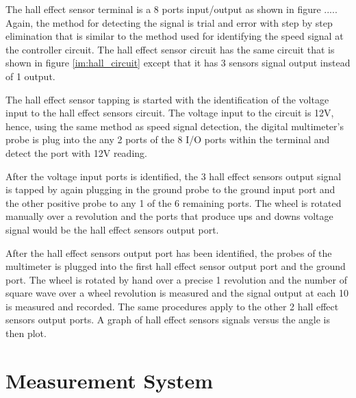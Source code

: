 The hall effect sensor terminal is a 8 ports input/output as shown in figure ..... Again, the method for detecting the signal is trial and error with step by step elimination that is similar to the method used for identifying the speed signal at the controller circuit. The hall effect sensor circuit has the same circuit that is shown in figure \ref{im:hall_circuit} except that it has 3 sensors signal output instead of 1 output. 

The hall effect sensor tapping is started with the identification of the voltage input to the hall effect sensors circuit. The voltage input to the circuit is 12V, hence, using the same method as speed signal detection, the digital multimeter's probe is plug into the any 2 ports of the 8 I/O ports within the terminal and detect the port with 12V reading.

After the voltage input ports is identified, the 3 hall effect sensors output signal is tapped by again plugging in the ground probe to the ground input port and the other positive probe to any 1 of the 6 remaining ports. The wheel is rotated manually over a revolution and the ports that produce ups and downs voltage signal would be the hall effect sensors output port.

After the hall effect sensors output port has been identified, the probes of the multimeter is plugged into the first hall effect sensor output port and the ground port. The wheel is rotated by hand over a precise 1 revolution and the number of square wave over a wheel revolution is measured and the signal output at each 10 \textdegree is measured and recorded. The same procedures apply to the other 2 hall effect sensors output ports. A graph of hall effect sensors signals versus the angle is then plot.

\section{Measurement System}

